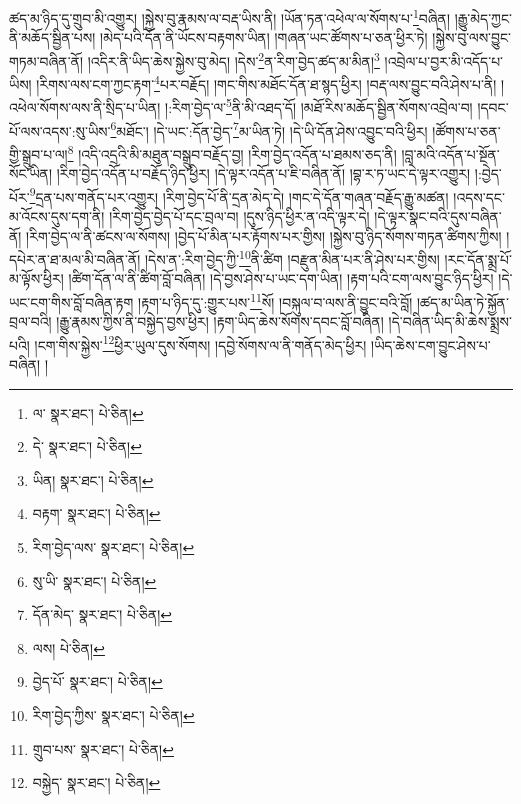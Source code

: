ཚད་མ་ཉིད་དུ་གྲུབ་མི་འགྱུར། །སྐྱེས་བུ་རྣམས་ལ་བརྡ་ཡིས་ནི། །ཡོན་ཏན་འཕེལ་ལ་སོགས་པ་\footnote{ལ་  སྣར་ཐང་།  པེ་ཅིན། }བཞིན། །རྒྱུ་མེད་ཀྱང་ནི་མཆོད་སྦྱིན་པས། །མེད་པའི་དོན་ནི་ཡོངས་བརྟགས་ཡིན། །གཞན་ཡང་ཚོགས་པ་ཅན་ཕྱིར་ཏེ། །སྐྱེས་བུ་ལས་བྱུང་གཏམ་བཞིན་ནོ། །འདིར་ནི་ཡིད་ཆེས་སྐྱེས་བུ་མེད། །དེས་\footnote{དེ་  སྣར་ཐང་།  པེ་ཅིན། }ན་རིག་བྱེད་ཚད་མ་མིན།\footnote{ཡིན།  སྣར་ཐང་།  པེ་ཅིན། } །འབྲེལ་པ་བྱར་མི་འདོད་པ་ཡིས། །རིགས་ལས་ངག་ཀྱང་རྟག་\footnote{བརྟག་  སྣར་ཐང་།  པེ་ཅིན། }པར་བརྗོད། །གང་གིས་མཐོང་དོན་ཐ་སྙད་ཕྱིར། །བརྡ་ལས་བྱུང་བའི་ཤེས་པ་ནི། །འཕེལ་སོགས་ལས་ནི་སྲིད་པ་ཡིན། །:རིག་བྱེད་ལ་\footnote{རིག་བྱེད་ལས་  སྣར་ཐང་།  པེ་ཅིན། }ནི་མི་འཐད་དོ། །མཐོ་རིས་མཆོད་སྦྱིན་སོགས་འབྲེལ་བ། །དབང་པོ་ལས་འདས་:སུ་ཡིས་\footnote{སུ་ཡི་  སྣར་ཐང་།  པེ་ཅིན། }མཐོང་། །དེ་ཡང་:དོན་བྱེད་\footnote{དོན་མེད་  སྣར་ཐང་།  པེ་ཅིན། }མ་ཡིན་ཏེ། །དེ་ཡི་དོན་ཤེས་འབྱུང་བའི་ཕྱིར། །ཚོགས་པ་ཅན་གྱི་སྒྲུབ་པ་ལ།\footnote{ལས།  པེ་ཅིན། } །འདི་འདྲའི་མི་མཐུན་བསྒྲུབ་བརྗོད་བྱ། །རིག་བྱེད་འདོན་པ་ཐམས་ཅད་ནི། །བླ་མའི་འདོན་པ་སྔོན་སོང་ཡིན། །རིག་བྱེད་འདོན་པ་བརྗོད་ཉིད་ཕྱིར། །དེ་ལྟར་འདོན་པ་ཇི་བཞིན་ནོ། །བྷ་ར་ཏ་ཡང་དེ་ལྟར་འགྱུར། །:བྱེད་པོར་\footnote{བྱེད་པོ་  སྣར་ཐང་།  པེ་ཅིན། }དྲན་པས་གནོད་པར་འགྱུར། །རིག་བྱེད་པོ་ནི་དྲན་མེད་དེ། །གང་དེ་དོན་གཞན་བརྗོད་རྒྱུ་མཚན། །འདས་དང་མ་འོངས་དུས་དག་ནི། །རིག་བྱེད་བྱེད་པོ་དང་བྲལ་བ། །དུས་ཉིད་ཕྱིར་ན་འདི་ལྟར་དེ། །དེ་ལྟར་སྣང་བའི་དུས་བཞིན་ནོ། །རིག་བྱེད་ལ་ནི་ཚངས་ལ་སོགས། །བྱེད་པོ་མིན་པར་རྟོགས་པར་གྱིས། །སྐྱེས་བུ་ཉིད་སོགས་གཏན་ཚིགས་ཀྱིས། །དཔེར་ན་ཐ་མལ་མི་བཞིན་ནོ། །དེས་ན་:རིག་བྱེད་ཀྱི་\footnote{རིག་བྱེད་ཀྱིས་  སྣར་ཐང་།  པེ་ཅིན། }ནི་ཚིག །བརྫུན་མིན་པར་ནི་ཤེས་པར་གྱིས། །རང་དོན་སྨྲ་པོ་མ་ལྟོས་ཕྱིར། །ཚིག་དོན་ལ་ནི་ཚིག་བློ་བཞིན། །དེ་བྱས་ཤེས་པ་ཡང་དག་ཡིན། །རྟག་པའི་ངག་ལས་བྱུང་ཉིད་ཕྱིར། །དེ་ཡང་ངག་གིས་བློ་བཞིན་རྟག །རྟག་པ་ཉིད་དུ་:གྱུར་པས་\footnote{གྲུབ་པས་  སྣར་ཐང་།  པེ་ཅིན། }སོ། །བསྐུལ་བ་ལས་ནི་བྱུང་བའི་བློ། །ཚད་མ་ཡིན་ཏེ་སྐྱོན་བྲལ་བའི། །རྒྱུ་རྣམས་ཀྱིས་ནི་བསྐྱེད་བྱས་ཕྱིར། །རྟག་ཡིད་ཆེས་སོགས་དབང་བློ་བཞིན། །དེ་བཞིན་ཡིད་མི་ཆེས་སྨྲས་པའི། །ངག་གིས་སྐྱེས་\footnote{བསྐྱེད་  སྣར་ཐང་།  པེ་ཅིན། }ཕྱིར་ཡུལ་དུས་སོགས། །དབྱེ་སོགས་ལ་ནི་གནོད་མེད་ཕྱིར། །ཡིད་ཆེས་ངག་བྱུང་ཤེས་པ་བཞིན། །
